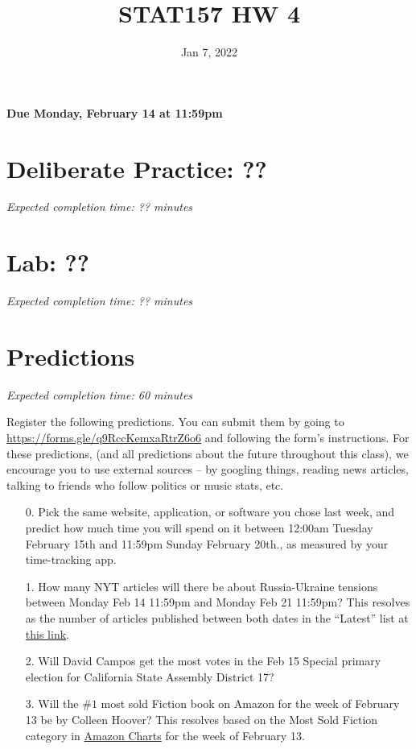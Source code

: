 \documentclass[11pt]{article}
\title{STAT157 HW 4}
\date{Jan 7, 2022}
\begin{document}
\maketitle

\hfill \textbf{Due Monday, February 14 at 11:59pm}

\section*{Deliberate Practice: ??}

\emph{Expected completion time: ?? minutes}

\section*{Lab: ??}

\emph{Expected completion time: ?? minutes}

\section*{Predictions}

\emph{Expected completion time: 60 minutes}

Register the following predictions. You can submit them by going to \url{https://forms.gle/q9RccKemxaRtrZ6o6} and following the form's instructions. For these predictions, (and all predictions about the future throughout this class), we encourage you to use external sources -- by googling things, reading news articles, talking to friends who follow politics or music stats, etc.

\begin{enumerate}
	\item[0.] Pick the same website, application, or software you chose last week, and predict how much time you will spend on it between 12:00am Tuesday February 15th and 11:59pm Sunday February 20th., as measured by your time-tracking app.

	\item[1.] How many NYT articles will there be about Russia-Ukraine tensions between Monday Feb 14 11:59pm and Monday Feb 21 11:59pm? This resolves as the number of articles published between both dates in the ``Latest'' list at \href{https://www.nytimes.com/news-event/ukraine-russia?name=styln-russia-ukraine&region=TOP_BANNER&block=storyline_menu_recirc&action=click&pgtype=LegacyCollection&variant=0_Control}{this link}.
	
	\item[2.] Will David Campos get the most votes in the Feb 15 Special primary election for California State Assembly District 17?
 
	\item[3.] Will the $\#1$ most sold Fiction book on Amazon for the week of February 13 be by Colleen Hoover? This resolves based on the Most Sold Fiction category in \href{https://www.amazon.com/charts/}{Amazon Charts} for the week of February 13.
\end{enumerate}
\end{document}
